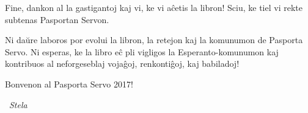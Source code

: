 {Fine, dankon al la gastigantoj kaj vi, ke vi aĉetis la libron! Sciu, ke tiel vi rekte subtenas Pasportan Servon.

Ni daŭre laboros por evolui la libron, la retejon kaj la komunumon de Pasporta Servo. Ni esperas, ke la libro eĉ pli vigligos la Esperanto-komunumon kaj kontribuos al neforgeseblaj vojaĝoj, renkontiĝoj, kaj babiladoj!

Bonvenon al Pasporta Servo 2017!

\vspace{.8em}

~\hfill\textit{\semibold Stela}
}
